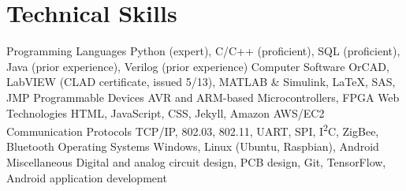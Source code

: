 \section{Technical Skills}
\begin{cvskills}
  \cvskill
    {Programming Languages}
    {Python (expert), C/C++ (proficient), SQL (proficient), Java (prior experience), Verilog (prior experience)}
  \cvskill
    {Computer Software}
    {OrCAD, LabVIEW (CLAD certificate, issued 5/13), MATLAB \& Simulink, \LaTeX, SAS, JMP}
  \cvskill
    {Programmable Devices}
    {AVR and ARM-based Microcontrollers, FPGA}
  \cvskill
    {Web Technologies}
    {HTML, JavaScript, CSS, Jekyll, Amazon AWS/EC2}
  \cvskill
    {Communication Protocols}
    {TCP/IP, 802.03, 802.11, UART, SPI, I\textsuperscript{2}C, ZigBee, Bluetooth}
  \cvskill
    {Operating Systems}
    {Windows, Linux (Ubuntu, Raspbian), Android}
  \cvskill
    {Miscellaneous}
    {Digital and analog circuit design, PCB design, Git, TensorFlow, Android application development}
\end{cvskills} 